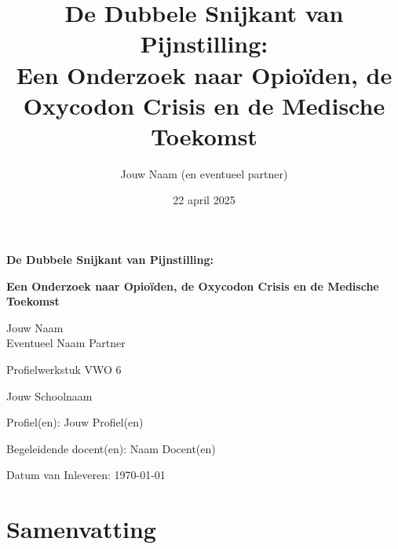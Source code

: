 \documentclass[11pt, a4paper]{report} %
\title{De Dubbele Snijkant van Pijnstilling: \\ Een Onderzoek naar Opioïden, de Oxycodon Crisis en de Medische Toekomst}
\author{Jouw Naam (en eventueel partner)}
\date{22 april 2025} %
\begin{document}
\begin{titlepage}
    \centering
    \vspace*{2cm} %

    {\Huge\bfseries De Dubbele Snijkant van Pijnstilling: \par}
    \vspace{0.5cm}
    {\Large\bfseries Een Onderzoek naar Opioïden, de Oxycodon Crisis en de Medische Toekomst\par}
    \vspace{2.5cm}

    {\Large Jouw Naam \\ [0.5cm] Eventueel Naam Partner \par}
    \vspace{1.5cm}

    {\large Profielwerkstuk VWO 6 \par}
    \vspace{0.5cm}
    {\large Jouw Schoolnaam \par} %
    \vspace{0.5cm}
    {\large Profiel(en): Jouw Profiel(en) \par} %
    \vspace{1.5cm}

    {\large Begeleidende docent(en): Naam Docent(en) \par} %
    \vspace{1.5cm}

    {\large Datum van Inleveren: \today \par} %

    \vfill %
\end{titlepage}

\chapter*{Samenvatting}
\setcounter{page}{1} %
\end{document}
